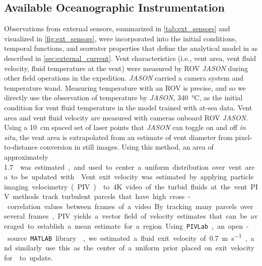 \subsection{Available Oceanographic Instrumentation}
\label{sec:ops_sensors}
Observations from external sensors, summarized in \cref{tab:ext_sensors} and visualized in \cref{fig:ext_sensors}, were incorporated into the initial conditions, temporal functions, and seawater properties that define the analytical model in \PHUMES as described in \cref{sec:external_current}. Vent characteristics (i.e., vent area, vent fluid velocity, fluid temperature at the vent) were measured by ROV \emph{JASON} during other field operations in the expedition. \emph{JASON} carried a camera system and temperature wand. Measuring temperature with an ROV is precise, and so we directly use the observation of temperature by \emph{JASON}, \SI{340}{\celsius}, as the initial condition for vent fluid temperature in the \PHUMES model trained with at-sea data. Vent area and vent fluid velocity are measured with cameras onboard ROV \emph{JASON}. Using a \SI{10}{\centi\meter} spaced set of laser points that \emph{JASON} can toggle on and off \emph{in situ}, the vent area is extrapolated from an estimate of vent diameter from pixel-to-distance conversion in still images. Using this method, an area of approximately \SI{1.7}{\meter\square} was estimated, and used to center a uniform distribution over vent area to be updated with \PHUMES. Vent exit velocity was estimated by applying particle imaging velocimetry (PIV) \autocite{zhang2019time} to 4K video of the turbid fluids at the vent. PIV methods track turbulent parcels that have high cross-correlation values between frames of a video. By tracking many parcels over several frames, PIV yields a vector field of velocity estimates that can be averaged to establish a mean estimate for a region. Using \verb|PIVLab|, an open-source \verb|MATLAB| library \autocite{thielicke2021particle,thielicke2014pivlab,thielicke2014flapping}, we estimated a fluid exit velocity of \SI{0.7}{\meter\per\second}, and similarly use this as the center of a uniform prior placed on exit velocity for \PHUMES to update.

